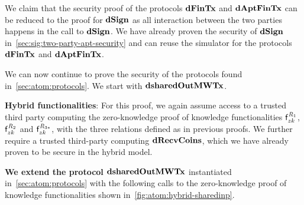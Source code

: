 We claim that the security proof of the protocols $\mathbf{dFinTx}$ and $\mathbf{dAptFinTx}$ can be reduced to the proof for $\mathbf{dSign}$ as all interaction between the two parties happens in the call to $\mathbf{dSign}$.
We have already proven the security of $\mathbf{dSign}$ in~\cref{sec:sig:two-party-apt-security} and can reuse the simulator for the protocols $\mathbf{dFinTx}$ and $\mathbf{dAptFinTx}$.

We can now continue to prove the security of the protocols found in~\cref{sec:atom:protocols}.
We start with $\mathbf{dsharedOutMWTx}$.

\textbf{Hybrid functionalities}: For this proof, we again assume access to a trusted third party computing the zero-knowledge proof of knowledge functionalities $\mathsf{f}^{\mathit{R}_1}_{zk}$, $\mathsf{f}^{\mathit{R}_2}_{zk}$ and $\mathsf{f}^{\mathit{R}_{3*}}_{zk}$, with the three relations defined as in previous proofs.
We further require a trusted third-party computing $\mathbf{dRecvCoins}$, which we have already proven to be secure in the hybrid model.

\textbf{We extend the protocol $\mathbf{dsharedOutMWTx}$} instantiated in~\cref{sec:atom:protocols} with the following calls to the zero-knowledge proof of knowledge functionalities shown in~\cref{fig:atom:hybrid-sharedinp}.


